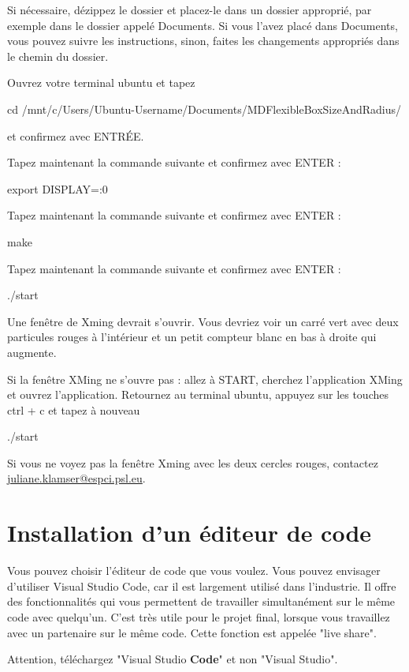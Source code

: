 \documentclass{article}
\begin{document}
Si nécessaire, dézippez le dossier et placez-le dans un dossier approprié, par exemple dans le dossier appelé Documents. Si vous l'avez placé dans Documents, vous pouvez suivre les instructions, sinon, faites les changements appropriés dans le chemin du dossier.

Ouvrez votre terminal ubuntu et tapez
\begin{tcolorbox}[width=\textwidth,colback={blue},title={ubuntu terminal},outer arc=0mm,colupper=white]    
    cd /mnt/c/Users/Ubuntu-Username/Documents/MDFlexibleBoxSizeAndRadius/
\end{tcolorbox}
et confirmez avec ENTRÉE.

Tapez maintenant la commande suivante et confirmez avec ENTER :
\begin{tcolorbox}[width=\textwidth,colback={blue},title={ubuntu terminal},outer arc=0mm,colupper=white]    
    export DISPLAY=:0
\end{tcolorbox}

Tapez maintenant la commande suivante et confirmez avec ENTER :
\begin{tcolorbox}[width=\textwidth,colback={blue},title={ubuntu terminal},outer arc=0mm,colupper=white]    
    make
\end{tcolorbox}

Tapez maintenant la commande suivante et confirmez avec ENTER :
\begin{tcolorbox}[width=\textwidth,colback={blue},title={ubuntu terminal},outer arc=0mm,colupper=white]    
    ./start
\end{tcolorbox}

Une fenêtre de Xming devrait s'ouvrir. Vous devriez voir un carré vert avec deux particules rouges à l'intérieur et un petit compteur blanc en bas à droite qui augmente.

Si la fenêtre XMing ne s'ouvre pas : allez à START, cherchez l'application XMing et ouvrez l'application. Retournez au terminal ubuntu, appuyez sur les touches ctrl + c et tapez à nouveau
\begin{tcolorbox}[width=\textwidth,colback={blue},title={ubuntu terminal},outer arc=0mm,colupper=white]    
    ./start
\end{tcolorbox}
Si vous ne voyez pas la fenêtre Xming avec les deux cercles rouges, contactez \href{mailto:example@example.com}{juliane.klamser@espci.psl.eu}.

\section{Installation d'un éditeur de code}
Vous pouvez choisir l'éditeur de code que vous voulez. Vous pouvez envisager d'utiliser Visual Studio Code, car il est largement utilisé dans l'industrie. Il offre des fonctionnalités qui vous permettent de travailler simultanément sur le même code avec quelqu'un. C'est très utile pour le projet final, lorsque vous travaillez avec un partenaire sur le même code. Cette fonction est appelée "live share". 

Attention, téléchargez "Visual Studio \textbf{Code}" et non "Visual Studio".


%  
\end{document}
